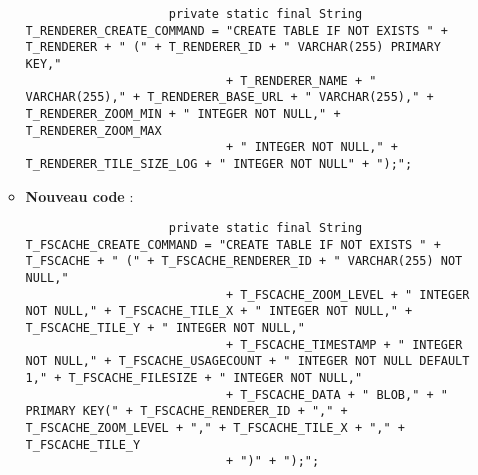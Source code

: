 \begin{enumerate}
\begin{itemize}
\begin{verbatim}
                    private static final String T_RENDERER_CREATE_COMMAND = "CREATE TABLE IF NOT EXISTS " + T_RENDERER + " (" + T_RENDERER_ID + " VARCHAR(255) PRIMARY KEY,"
                            + T_RENDERER_NAME + " VARCHAR(255)," + T_RENDERER_BASE_URL + " VARCHAR(255)," + T_RENDERER_ZOOM_MIN + " INTEGER NOT NULL," + T_RENDERER_ZOOM_MAX
                            + " INTEGER NOT NULL," + T_RENDERER_TILE_SIZE_LOG + " INTEGER NOT NULL" + ");";
                    \end{verbatim}
              \item \textbf{Nouveau code} :
                    \begin{verbatim}
                    private static final String T_FSCACHE_CREATE_COMMAND = "CREATE TABLE IF NOT EXISTS " + T_FSCACHE + " (" + T_FSCACHE_RENDERER_ID + " VARCHAR(255) NOT NULL,"
                            + T_FSCACHE_ZOOM_LEVEL + " INTEGER NOT NULL," + T_FSCACHE_TILE_X + " INTEGER NOT NULL," + T_FSCACHE_TILE_Y + " INTEGER NOT NULL,"
                            + T_FSCACHE_TIMESTAMP + " INTEGER NOT NULL," + T_FSCACHE_USAGECOUNT + " INTEGER NOT NULL DEFAULT 1," + T_FSCACHE_FILESIZE + " INTEGER NOT NULL,"
                            + T_FSCACHE_DATA + " BLOB," + " PRIMARY KEY(" + T_FSCACHE_RENDERER_ID + "," + T_FSCACHE_ZOOM_LEVEL + "," + T_FSCACHE_TILE_X + "," + T_FSCACHE_TILE_Y
                            + ")" + ");";
                    \end{verbatim}
          \end{itemize}
\end{enumerate}